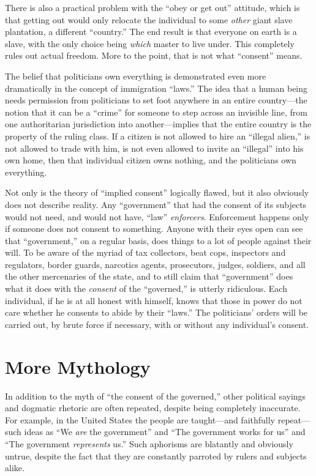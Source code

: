 \documentclass{book}
\begin{document}
There is also a practical problem with the \enquote{obey or get out} attitude, which is that getting out would only relocate the individual to some \emph{other} giant slave plantation, a different \enquote{country.} The end result is that everyone on earth is a slave, with the only choice being \emph{which} master to live under. This completely rules out actual freedom. More to the point, that is not what \enquote{consent} means.

The belief that politicians own everything is demonstrated even more dramatically in the concept of immigration \enquote{laws.} The idea that a human being needs permission from politicians to set foot anywhere in an entire country---the notion that it can be a \enquote{crime} for someone to step across an invisible line, from one authoritarian jurisdiction into another---implies that the entire country is the property of the ruling class. If a citizen is not allowed to hire an \enquote{illegal alien,} is not allowed to trade with him, is not even allowed to invite an \enquote{illegal} into his own home, then that individual citizen owns nothing, and the politicians own everything.

Not only is the theory of \enquote{implied consent} logically flawed, but it also obviously does not describe reality. Any \enquote{government} that had the consent of its subjects would not need, and would not have, \enquote{law} \emph{enforcers}. Enforcement happens only if someone does not consent to something. Anyone with their eyes open can see that \enquote{government,} on a regular basis, does things to a lot of people against their will. To be aware of the myriad of tax collectors, beat cops, inspectors and regulators, border guards, narcotics agents, prosecutors, judges, soldiers, and all the other mercenaries of the state, and to still claim that \enquote{government} does what it does with the \emph{consent} of the \enquote{governed,} is utterly ridiculous. Each individual, if he is at all honest with himself, knows that those in power do not care whether he consents to abide by their \enquote{laws.} The politicians' orders will be carried out, by brute force if necessary, with or without any individual's consent.

\section{More Mythology}

In addition to the myth of \enquote{the consent of the governed,} other political sayings and dogmatic rhetoric are often repeated, despite being completely inaccurate. For example, in the United States the people are taught---and faithfully repeat---such ideas as \enquote{We \emph{are} the government} and \enquote{The government works for us} and \enquote{The government \emph{represents} us.} Such aphorisms are blatantly and obviously untrue, despite the fact that they are constantly parroted by rulers and subjects alike.
\end{document}
